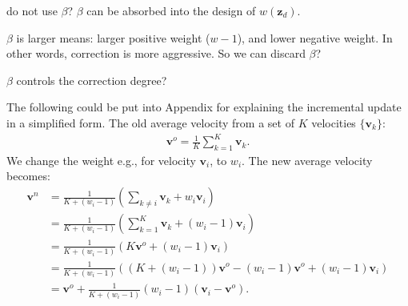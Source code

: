 \documentclass{article} %
\begin{document}
{
\color{blue}
do not use $\beta$?
$\beta$ can be absorbed into
the design of $w(\mathbf{z}_d)$.

$\beta$ is larger means:
larger positive weight
($w - 1$),
and lower negative weight.
In other words,
correction 
is
more aggressive.
So we can discard $\beta$?

$\beta$ controls
the correction degree?
}

{
\color{gray}
The following could be put into
Appendix
for explaining the incremental update
in a simplified form.
The old average velocity from
a set of $K$ velocities $\{\mathbf{v}_k\}$:
\begin{align}
    \mathbf{v}^o
    = \frac{1}{K}\sum_{k=1}^K \mathbf{v}_k.
\end{align}
We change the weight
e.g.,
for velocity $\mathbf{v}_i$,
to $w_i$.
The new average velocity becomes:
\begin{align}
    \mathbf{v}^n
    & = \frac{1}{K + (w_i -1)} 
    (
    \sum_{k\neq i} \mathbf{v}_k
    + w_i \mathbf{v}_i
    ) \\
    & = \frac{1}{K + (w_i -1)} 
    (
    \sum_{k=1}^K  \mathbf{v}_k
    + (w_i -1) \mathbf{v}_i
    )
    \\
    & = \frac{1}{K + (w_i -1)} 
    (
    K  \mathbf{v}^o
    + (w_i -1) \mathbf{v}_i
    )
    \\
    & = \frac{1}{K + (w_i -1)} 
    (
    (K + (w_i -1))\mathbf{v}^o
    -
    (w_i -1) \mathbf{v}^o
    + 
    (w_i -1) \mathbf{v}_i
    )  
    \\
    & = 
    \mathbf{v}^o
    +
    \frac{1}{K + (w_i -1)} 
    (w_i -1) ( \mathbf{v}_i
    - \mathbf{v}^o).
\end{align}

}
\end{document}
